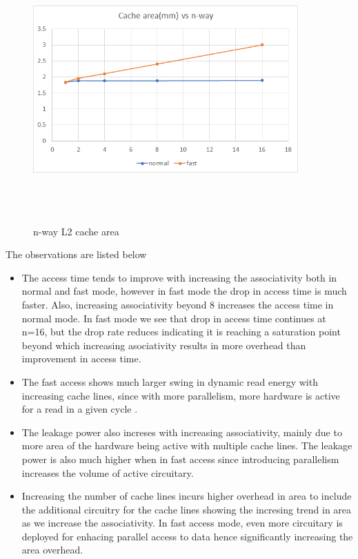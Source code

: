 \documentclass{tufte-handout}
\begin{document}
		\begin{figure}[h!]
		\label{fig:cachearea}
		\centering
		\includegraphics[width = 4in, height = 4in]{cachearea}
		\caption{n-way L2 cache area }
		\end{figure}

		The observations are listed below
		\begin{itemize}
			\item The access time tends to improve with increasing the associativity both in normal and fast mode, however in fast mode the drop in access time is much faster. Also, increasing associativity beyond 8 increases the access time in normal mode. In fast mode we see that drop in access time continues at n=16, but the drop rate reduces indicating it is reaching a saturation point beyond which increasing asociativity results in more overhead than improvement in access time.
			\item The fast access shows much larger swing in dynamic read energy with increasing cache lines, since with more parallelism, more hardware is active for a read in a given cycle .
			\item The leakage power also increses with increasing associativity, mainly due to more area of the hardware being active with multiple cache lines. The leakage power is also much higher when in fast access since introducing parallelism increases the volume of active circuitary.
			\item Increasing the number of cache lines incurs higher overhead in area to include the additional circuitry for the cache lines showing the incresing trend in area as we increase the associativity. In fast access mode, even more circuitary is deployed for enhacing parallel access to data hence significantly increasing the area overhead.
		\end{itemize}
\end{document}
